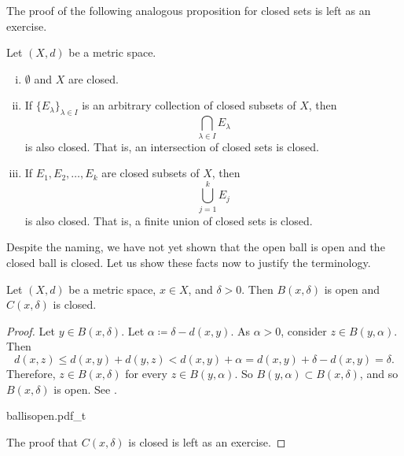 The proof of the following analogous proposition for closed sets
is left as an exercise.

\begin{prop} \label{prop:topology:closed}
\pagebreak[2]
Let $(X,d)$ be a metric space.
\begin{enumerate}[(i)]
\item \label{topology:closedi} $\emptyset$ and $X$ are closed.
\item \label{topology:closedii} If $\{ E_\lambda \}_{\lambda \in I}$ is
an arbitrary collection of closed subsets of $X$, then
\begin{equation*}
\bigcap_{\lambda \in I} E_\lambda
\end{equation*}
is also closed.  That is, an intersection of closed sets is closed.
\item \label{topology:closediii} If $E_1, E_2, \ldots, E_k$ are closed
subsets of $X$, then
\begin{equation*}
\bigcup_{j=1}^k E_j
\end{equation*}
is also closed.  That is, a finite union of closed sets is closed.
\end{enumerate}
\end{prop}

Despite the naming,
we have not yet shown that the open ball is open and the closed ball is
closed.  Let us show these facts now to justify the terminology.

\begin{prop} \label{prop:topology:ballsopenclosed}
Let $(X,d)$ be a metric space, $x \in X$, and $\delta > 0$.  Then
$B(x,\delta)$ is open and 
$C(x,\delta)$ is closed.
\end{prop}

\begin{proof}
Let $y \in B(x,\delta)$.  Let $\alpha \coloneqq \delta-d(x,y)$.  As $\alpha
> 0$, consider $z \in B(y,\alpha)$.  Then
\begin{equation*}
d(x,z) \leq d(x,y) + d(y,z) < d(x,y) + \alpha = d(x,y) + \delta-d(x,y) =
\delta .
\end{equation*}
Therefore, $z \in B(x,\delta)$ for every $z \in B(y,\alpha)$.  So
$B(y,\alpha) \subset B(x,\delta)$, and so
$B(x,\delta)$ is open.  See .

\begin{myfigureht}
{ballisopen.pdf_t}
\caption{Proof that $B(x,\delta)$ is open: $B(y,\alpha) \subset
B(x,\delta)$ with the triangle inequality illustrated.\label{fig:ballisopen}}
\end{myfigureht}

The proof that $C(x,\delta)$ is closed is left as an exercise.
\end{proof}

